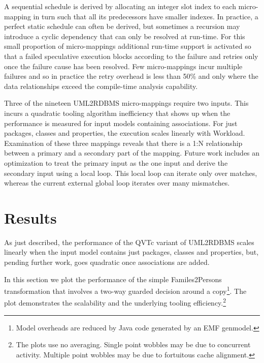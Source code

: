 \documentclass{llncs}
\begin{document}
A sequential schedule is derived by allocating an integer slot index to each micro-mapping in turn such that all its predecessors have smaller indexes. In practice, a perfect static schedule can often be derived, but sometimes a recursion may introduce a cyclic dependency that can only be resolved at run-time. For this small proportion of micro-mappings additional run-time support is activated so that a failed speculative execution blocks according to the failure and retries only once the failure cause has been resolved. Few micro-mappings incur multiple failures and so in practice the retry overhead is less than 50\% and only where the data relationships exceed the compile-time analysis capability.

Three of the nineteen UML2RDBMS micro-mappings require two inputs. This incurs a quadratic tooling algorithm inefficiency that shows up when the performance is measured for input models containing associations. For just packages, classes and properties, the execution scales linearly with Workload. Examination of these three mappings reveals that there is a 1:N relationship between a primary and a secondary part of the mapping. Future work includes an optimization to treat the primary input as the one input and derive the secondary input using a local loop. This local loop can iterate only over matches, whereas the current external global loop iterates over many mismatches.


\section{Results}\label{Results}

As just described, the performance of the QVTc variant of UML2RDBMS scales linearly when the input model contains just packages, classes and properties, but, pending further work, goes quadratic once associations are added.

In this section we plot the performance of the simple Familes2Persons transformation that involves a two-way guarded decision around a copy\footnote{Model overheads are reduced by Java code generated by an EMF genmodel.}. The plot demonstrates the scalability and the underlying tooling efficiency.\footnote{The plots use no averaging. Single point wobbles may be due to concurrent activity. Multiple point wobbles may be due to fortuitous cache alignment.}
\end{document}
